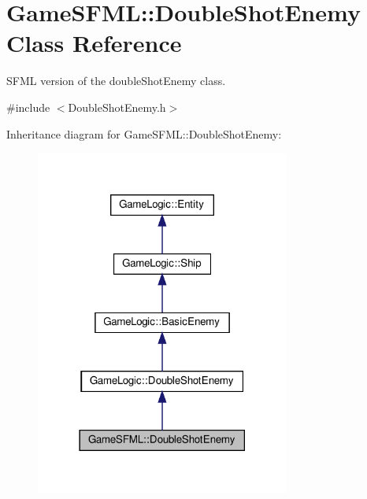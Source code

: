 \hypertarget{classGameSFML_1_1DoubleShotEnemy}{}\section{Game\+S\+F\+ML\+:\+:Double\+Shot\+Enemy Class Reference}
\label{classGameSFML_1_1DoubleShotEnemy}


S\+F\+ML version of the double\+Shot\+Enemy class.  




{\ttfamily \#include $<$Double\+Shot\+Enemy.\+h$>$}



Inheritance diagram for Game\+S\+F\+ML\+:\+:Double\+Shot\+Enemy\+:
\nopagebreak
\begin{figure}[H]
\begin{center}
\leavevmode
\includegraphics[width=237pt]{classGameSFML_1_1DoubleShotEnemy__inherit__graph}
\end{center}
\end{figure}


